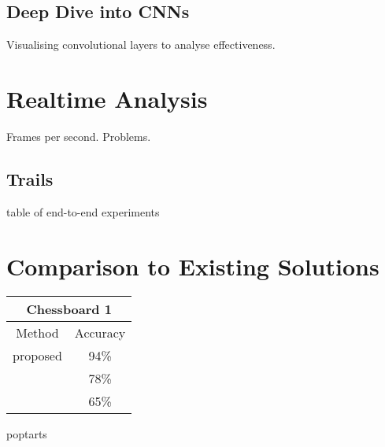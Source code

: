 \subsection{Deep Dive into CNNs}
Visualising convolutional layers to analyse effectiveness.

\section{Realtime Analysis}
Frames per second.  Problems.

\subsection{Trails}
table of end-to-end experiments

\section{Comparison to Existing Solutions}
\begin{center}
\begin{tabular}{|c|c|}
    \multicolumn{2}{c}{Chessboard 1} \\
    \hline
    Method & Accuracy \\
    \hline
    proposed & 94\% \\
    \cite{} & 78\% \\
    \cite{} & 65\%  \\
    \hline
\end{tabular}
\end{center}

poptarts